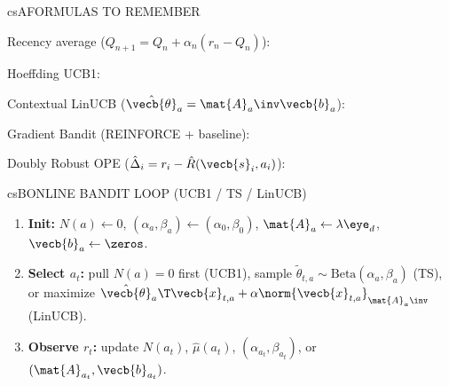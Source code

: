 \documentclass[../../../../master.tex]{subfiles}
\begin{document}

\csnextpage

\begin{cscolumns}
\begin{cscard}{csA}{FORMULAS TO REMEMBER}
  \begin{csbul}
    \item Recency average ($Q_{n+1} = Q_n + \alpha_n(r_n-Q_n)$):
    \item Hoeffding UCB1:
    \item Contextual LinUCB ($\hat{\vecb{\theta}}_a = \mat{A}_a\inv\vecb{b}_a$):
    \item Gradient Bandit (REINFORCE + baseline):
    \item Doubly Robust OPE ($\hat{\Delta}_i = r_i - \hat{R}(\vecb{s}_i,a_i)$):
  \end{csbul}
\end{cscard}

\begin{cscard}{csB}{ONLINE BANDIT LOOP (UCB1 / TS / LinUCB)}
  \begin{enumerate}[leftmargin=1.2em, itemsep=1pt, topsep=1pt, parsep=0pt]
    \item \textbf{Init:} $N(a)\gets 0$, $(\alpha_a,\beta_a)\gets(\alpha_0,\beta_0)$, $\mat{A}_a\gets\lambda\eye_d$, $\vecb{b}_a\gets\zeros$.
    \item \textbf{Select $a_t$:} pull $N(a)=0$ first (UCB1), sample $\tilde{\theta}_{t,a}\sim\mathrm{Beta}(\alpha_a,\beta_a)$ (TS), or maximize $\hat{\vecb{\theta}}_a\T\vecb{x}_{t,a}+\alpha\norm{\vecb{x}_{t,a}}_{\mat{A}_a\inv}$ (LinUCB).
    \item \textbf{Observe $r_t$:} update $N(a_t)$, $\hat{\mu}(a_t)$, $(\alpha_{a_t},\beta_{a_t})$, or $(\mat{A}_{a_t},\vecb{b}_{a_t})$.
  \end{enumerate}
\end{cscard}
\columnbreak


\end{cscolumns}
\end{document}
